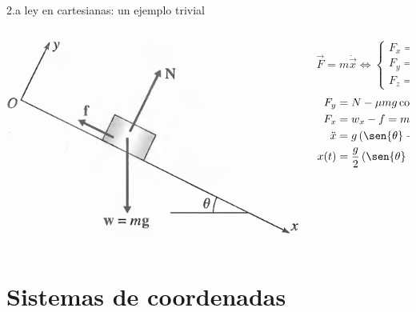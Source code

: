 \documentclass[serif]{beamer}
\begin{document}
\begin{frame}
\begin{block}{2.a ley en cartesianas: un ejemplo trivial}
\begin{columns}[c]
	\begin{column}{0.35\textwidth}
		\includegraphics[width=\textwidth]{taylor1_9}
	\end{column}
  \begin{column}{0.65\textwidth}
		\[
		\vec{F}= m \ddot{\vec{x}} \iff
		\begin{cases}
			F_x = m \ddot{x} \\
			F_y = m \ddot{y} \\
			F_z = m \ddot{z}
		\end{cases}
		\]
		\pause
		\begin{align*}
			F_y &= N - \mu m g \cos{\theta} = 0\\
			F_x &= w_x- f = m g \sen{\theta} - \mu m g \cos{\theta} = m \ddot{x}\\
			\ddot{x} &= g \left(\sen{\theta} - \mu \cos{\theta}\right)\\
			x(t) &= \frac{g}{2} \left(\sen{\theta} - \mu \cos{\theta}\right) t^2 \, [\dot{x}(0)=0, x(0)=0]
		\end{align*}
	\end{column}
\end{columns}
\end{block}
\end{frame}


\section{Sistemas de coordenadas}
\end{document}
